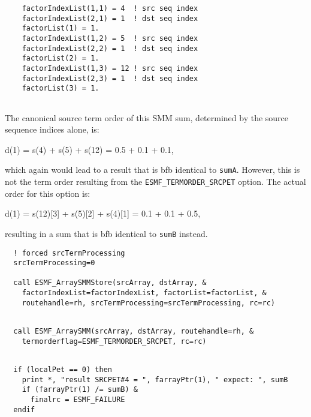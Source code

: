  \begin{verbatim}
    factorIndexList(1,1) = 4  ! src seq index
    factorIndexList(2,1) = 1  ! dst seq index
    factorList(1) = 1.
    factorIndexList(1,2) = 5  ! src seq index
    factorIndexList(2,2) = 1  ! dst seq index
    factorList(2) = 1.
    factorIndexList(1,3) = 12 ! src seq index
    factorIndexList(2,3) = 1  ! dst seq index
    factorList(3) = 1.
 
\end{verbatim}
 

   The canonical source term order of this SMM sum, determined by the source
   sequence indices alone, is:
  
       d(1) = s(4) + s(5) + s(12) = 0.5 + 0.1 + 0.1,
  
   which again would lead to a result that is bfb identical to {\tt sumA}. 
   However, this is not the term order resulting from the
   {\tt ESMF\_TERMORDER\_SRCPET} option. The actual order for this option is:
  
       d(1) = s(12)[3] + s(5)[2] + s(4)[1] = 0.1 + 0.1 + 0.5,
  
   resulting in a sum that is bfb identical to {\tt sumB} instead. 

 \begin{verbatim}
  ! forced srcTermProcessing
  srcTermProcessing=0
  
  call ESMF_ArraySMMStore(srcArray, dstArray, &
    factorIndexList=factorIndexList, factorList=factorList, &
    routehandle=rh, srcTermProcessing=srcTermProcessing, rc=rc)
 
\end{verbatim}
 

 \begin{verbatim}
  call ESMF_ArraySMM(srcArray, dstArray, routehandle=rh, &
    termorderflag=ESMF_TERMORDER_SRCPET, rc=rc)
 
\end{verbatim}
 

 \begin{verbatim}
  if (localPet == 0) then
    print *, "result SRCPET#4 = ", farrayPtr(1), " expect: ", sumB
    if (farrayPtr(1) /= sumB) &
      finalrc = ESMF_FAILURE
  endif
 
\end{verbatim}
 

